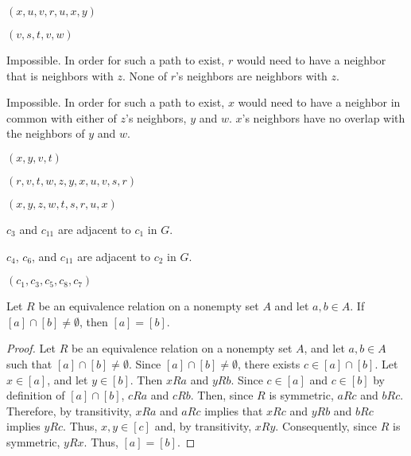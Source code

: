 \documentclass[12pt]{article}
\begin{document}

    $(x, u, v, r, u, x, y)$


    $(v, s, t, v, w)$


    Impossible. In order for such a path to exist, $r$ would need to have a neighbor that is neighbors with $z$. None of $r$'s neighbors are neighbors with $z$.


    Impossible. In order for such a path to exist, $x$ would need to have a neighbor in common with either of $z$'s neighbors, $y$ and $w$. $x$'s neighbors have no overlap with the neighbors of $y$ and $w$.
    

    $(x, y, v, t)$


    $(r, v, t, w, z, y, x, u, v, s, r)$


    $(x, y, z, w, t, s, r, u, x)$

\newpage
{}


    $c_3$ and $c_{11}$ are adjacent to $c_1$ in $G$.


    $c_4$, $c_6$, and $c_{11}$ are adjacent to $c_2$ in $G$.




    $(c_1, c_3, c_5, c_8, c_7)$

\bigskip
{} Let $R$ be an equivalence relation on a nonempty set $A$ and let $a,b\in A$. If $[a]\cap[b] \neq \emptyset$, then $[a] = [b]$.
\begin{proof}
    Let $R$ be an equivalence relation on a nonempty set $A$, and let $a,b \in A$ such that $[a] \cap [b] \neq \emptyset$.
    Since $[a] \cap [b] \neq \emptyset$, there exists $c \in [a] \cap [b]$.
    Let $x \in [a]$, and let $y \in [b]$. Then $x R a$ and $y R b$.
    Since $c \in [a]$ and $c \in [b]$ by definition of $[a]\cap[b]$, $c R a$ and $c R b$.
    Then, since $R$ is symmetric, $a R c$ and $b R c$.
    Therefore, by transitivity, $x R a $ and $ aR c$ implies that $x R c$ and $y R b$ and $b R c$ implies $y R c$. Thus, $x , y\in[c]$ and, by transitivity, $x R y$.
    Consequently, since $R$ is symmetric, $y R x$. Thus, $[a] = [b]$.
\end{proof}
\end{document}
